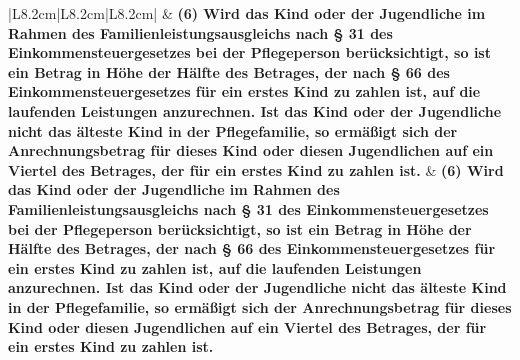 \documentclass[10pt,a4paper,landscape]{article}
\begin{document}
\begin{longtable}{|L{8.2cm}|L{8.2cm}|L{8.2cm}|}
 & \textbf{(6) Wird das Kind oder der Jugendliche  \newline im Rahmen des  \newline Familienleistungsausgleichs nach \S{} 31  \newline des Einkommensteuergesetzes bei der  \newline Pflegeperson berücksichtigt, so ist ein  \newline Betrag in Höhe der Hälfte des Betrages,  \newline der nach \S{} 66 des  \newline Einkommensteuergesetzes für ein  \newline erstes Kind zu zahlen ist, auf die  \newline laufenden Leistungen anzurechnen. Ist  \newline das Kind oder der Jugendliche nicht das  \newline älteste Kind in der Pflegefamilie, so  \newline ermäßigt sich der Anrechnungsbetrag  \newline für dieses Kind oder diesen  \newline Jugendlichen auf ein Viertel des  \newline Betrages, der für ein erstes Kind zu  \newline zahlen ist. } & \textbf{(6) Wird das Kind oder der Jugendliche  \newline im Rahmen des  \newline Familienleistungsausgleichs nach \S{} 31  \newline des Einkommensteuergesetzes bei der  \newline Pflegeperson berücksichtigt, so ist ein  \newline Betrag in Höhe der Hälfte des Betrages,  \newline der nach \S{} 66 des  \newline Einkommensteuergesetzes für ein  \newline erstes Kind zu zahlen ist, auf die  \newline laufenden Leistungen anzurechnen. Ist  \newline das Kind oder der Jugendliche nicht das  \newline älteste Kind in der Pflegefamilie, so  \newline ermäßigt sich der Anrechnungsbetrag  \newline für dieses Kind oder diesen  \newline Jugendlichen auf ein Viertel des  \newline Betrages, der für ein erstes Kind zu  \newline zahlen ist. } \\

\end{longtable}
\end{document}
